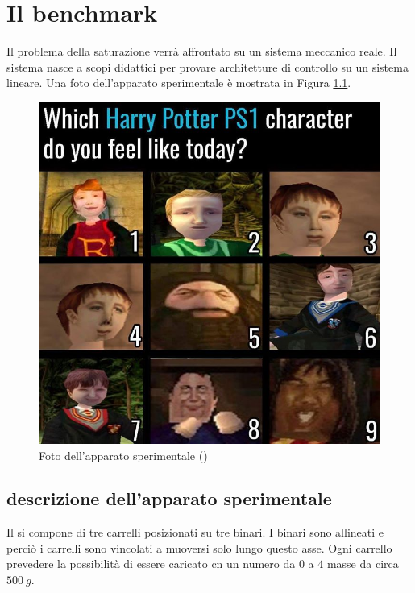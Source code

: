 \chapter{Il benchmark}
Il problema della saturazione verrà affrontato su un sistema meccanico reale. Il sistema nasce a scopi didattici per provare architetture di controllo su un sistema lineare. Una foto dell'apparato sperimentale è mostrata in Figura \ref{fig:fotosetup}.
\begin{figure}
	\centering
	\includegraphics[height=0.5\linewidth]{img/foto_setup}
	\caption{Foto dell'apparato sperimentale (\treM)}
	\label{fig:fotosetup}
\end{figure}
\section{descrizione dell'apparato sperimentale}
Il \treM si compone di tre carrelli posizionati su tre binari. I binari sono allineati e perciò i carrelli sono vincolati a muoversi solo lungo questo asse. Ogni carrello prevedere la possibilità di essere caricato cn un numero da $0$ a $4$ masse da circa $500 \ g$.



